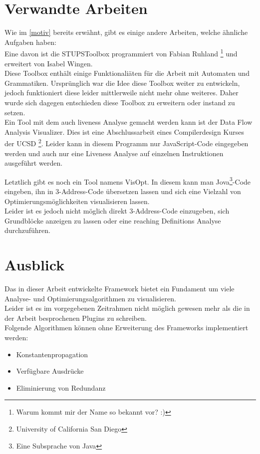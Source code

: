 \section{Verwandte Arbeiten}

Wie im \cref{motiv} bereits erwähnt, gibt es einige andere Arbeiten,
welche ähnliche Aufgaben haben:\\

Eine davon ist die STUPSToolbox\cite{toolbox} programmiert von Fabian Ruhland
\footnote{Warum kommt mir der Name so bekannt vor? :)}
und erweitert von Isabel Wingen.\\
Diese Toolbox enthält einige Funktionaliäten für die Arbeit mit Automaten
und Grammatiken. Ursprünglich war die Idee diese Toolbox weiter zu entwickeln,
jedoch funktioniert diese leider mittlerweile nicht mehr ohne weiteres. Daher wurde
sich dagegen entschieden diese Toolbox zu erweitern oder instand zu setzen.\\

Ein Tool mit dem auch liveness Analyse gemacht werden kann ist der
Data Flow Analysis Visualizer\cite{dfav}. Dies ist eine Abschlussarbeit\cite{dfavpres}
eines Compilerdesign Kurses der UCSD
\footnote{University of California San Diego}.
Leider kann in diesem Programm nur JavaScript-Code eingegeben werden
und auch nur eine Liveness Analyse auf einzelnen Instruktionen ausgeführt werden.

Letztlich gibt es noch ein Tool namens VisOpt\cite{VisOpt}.
In diesem kann man Jova\footnote{Eine Subsprache von Java}-Code eingeben,
ihn in 3-Address-Code übersetzen lassen und sich eine Vielzahl 
von Optimierungsmöglichkeiten visualisieren lassen.\\
Leider ist es jedoch nicht möglich direkt 3-Address-Code einzugeben,
sich Grundblöcke anzeigen zu lassen oder eine reaching Definitions Analyse
durchzuführen.\\

\newpage
\section{Ausblick}
Das in dieser Arbeit entwickelte Framework bietet ein Fundament
um viele Analyse- und Optimierungsalgorithmen zu visualisieren.\\
Leider ist es im vorgegebenen Zeitrahmen nicht möglich gewesen mehr als
die in der Arbeit besprochenen Plugins zu schreiben.\\

Folgende Algorithmen können ohne Erweiterung des Frameworks implementiert werden:
\begin{itemize}
  \item Konstantenpropagation
  \item Verfügbare Ausdrücke
  \item Eliminierung von Redundanz
\end{itemize}


